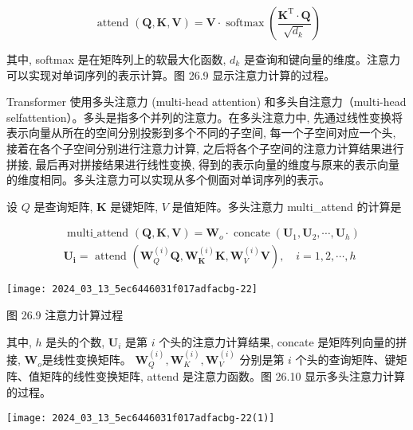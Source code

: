 \documentclass[10pt]{article}
\begin{document}
\begin{equation*}
\text { attend }(\boldsymbol{Q}, \boldsymbol{K}, \boldsymbol{V})=\boldsymbol{V} \cdot \operatorname{softmax}\left(\frac{\boldsymbol{K}^{\mathrm{T}} \cdot \boldsymbol{Q}}{\sqrt{d_{k}}}\right) \tag{26.21}
\end{equation*}


其中, softmax 是在矩阵列上的软最大化函数, $d_{k}$ 是查询和键向量的维度。注意力可以实现对单词序列的表示计算。图 26.9 显示注意力计算的过程。

Transformer 使用多头注意力 (multi-head attention) 和多头自注意力（multi-head selfattention）。多头是指多个并列的注意力。在多头注意力中, 先通过线性变换将表示向量从所在的空间分别投影到多个不同的子空间, 每一个子空间对应一个头, 接着在各个子空间分别进行注意力计算, 之后将各个子空间的注意力计算结果进行拼接, 最后再对拼接结果进行线性变换, 得到的表示向量的维度与原来的表示向量的维度相同。多头注意力可以实现从多个侧面对单词序列的表示。

设 $Q$ 是查询矩阵, $\boldsymbol{K}$ 是键矩阵, $V$ 是值矩阵。多头注意力 multi\_attend 的计算是


\begin{align*}
& \text { multi_attend }(\boldsymbol{Q}, \boldsymbol{K}, \boldsymbol{V})=\boldsymbol{W}_{o} \cdot \operatorname{concate}\left(\boldsymbol{U}_{1}, \boldsymbol{U}_{2}, \cdots, \boldsymbol{U}_{h}\right)  \tag{26.22}\\
& \boldsymbol{U}_{\boldsymbol{i}}=\text { attend }\left(\boldsymbol{W}_{Q}^{(i)} \boldsymbol{Q}, \boldsymbol{W}_{\boldsymbol{K}}^{(i)} \boldsymbol{K}, \boldsymbol{W}_{V}^{(i)} \boldsymbol{V}\right), \quad i=1,2, \cdots, h \tag{26.23}
\end{align*}


\begin{center}
\texttt{[image: 2024\_03\_13\_5ec6446031f017adfacbg-22]}
\end{center}

图 26.9 注意力计算过程

其中, $h$ 是头的个数, $\boldsymbol{U}_{i}$ 是第 $i$ 个头的注意力计算结果, concate 是矩阵列向量的拼接, $\boldsymbol{W}_{o}$是线性变换矩阵。 $\boldsymbol{W}_{Q}^{(i)}, \boldsymbol{W}_{K}^{(i)}, \boldsymbol{W}_{V}^{(i)}$ 分别是第 $i$ 个头的查询矩阵、键矩阵、值矩阵的线性变换矩阵, attend 是注意力函数。图 26.10 显示多头注意力计算的过程。

\begin{center}
\texttt{[image: 2024\_03\_13\_5ec6446031f017adfacbg-22(1)]}
\end{center}
\end{document}
